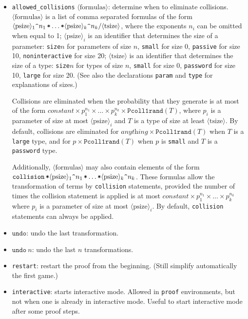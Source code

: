 \documentclass{article}
\newcommand{\tttimes}{\mathop{\texttt{*}}}
\newcommand{\nonterm}[1]{\langle\textrm{#1}\rangle}
\begin{document}
\begin{itemize}
\item \texttt{allowed\string_collisions} $\nonterm{formulas}$: 
determine when to eliminate collisions. $\nonterm{formulas}$ is 
a list of comma separated formulas of the form
$\nonterm{psize}_1\texttt{\string^}{n_1} \tttimes \dots \tttimes \nonterm{psize}_k\texttt{\string^}{n_k} / \nonterm{tsize}$,
where the exponents $n_i$ can be omitted when equal to 1;
$\nonterm{psize}_i$ is an identifier that determines the size of a
parameter: \texttt{size$n$} for parameters of size $n$,
\texttt{small} for size 0, \texttt{passive} for size 10,
\texttt{noninteractive} for size 20;
$\nonterm{tsize}$ is an identifier that determines the size of a type:
\texttt{size$n$} for types of size $n$,
\texttt{small} for size 0, \texttt{password} for size 10,
\texttt{large} for size 20. (See also the declarations \texttt{param}
and \texttt{type} for explanations of sizes.)

Collisions are eliminated when the probability that they generate
is at most of the form  $\textit{constant} \times p_1^{n_1} \times \dots \times p_k^{n_k} \times \texttt{Pcoll1rand}(T)$,
where $p_i$ is a parameter of size at most $\nonterm{psize}_i$
and $T$ is a type of size at least $\nonterm{tsize}$.
By default, collisions are eliminated for $\textit{anything} \times \texttt{Pcoll1rand}(T)$ when $T$ is a \texttt{large} type,
and for $p \times \texttt{Pcoll1rand}(T)$ when $p$ is \texttt{small} and $T$ is a \texttt{password} type.

Additionally, $\nonterm{formulas}$ may also contain elements of the form
$ \texttt{collision} \tttimes \nonterm{psize}_1\texttt{\string^}{n_1} \tttimes \dots \tttimes \nonterm{psize}_k\texttt{\string^}{n_k}$.
These formulas allow the transformation of terms by \texttt{collision} statements, provided 
the number of times the collision statement is applied is at most 
$\textit{constant} \times p_1^{n_1} \times \dots \times p_k^{n_k}$
where $p_i$ is a parameter of size at most $\nonterm{psize}_i$.
By default, \texttt{collision} statements can always be applied.

\item $\texttt{undo}$: undo the last transformation.

\item $\texttt{undo}\ n$: undo the last $n$ transformations.

\item \texttt{restart}: restart the proof from the beginning.
(Still simplify automatically the first game.)

\item \texttt{interactive}: starts interactive mode.
Allowed in \texttt{proof} environments, but not when one is
already in interactive mode. Useful to start interactive mode
after some proof steps.

\end{itemize}
\end{document}

